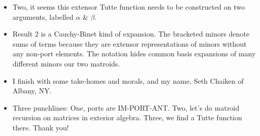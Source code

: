 \documentclass[14pt]{extarticle}
\begin{document}
{\begin{itemize}
\item
  Two, it seems this extensor Tutte function needs to be constructed on 
  two arguments, labelled $\alpha$ \& $\beta$.


\item
  Result 2 is a Cauchy-Binet kind of expansion. The bracketed minors denote sums of terms
  because they are extensor representations of minors without any non-port elements.
  The notation hides common basis expansions of many different minors our two matroids.


\item
  I finish with some take-homes and morals, and my name, Seth Chaiken
  of Albany, NY.

  \item
  Three punchlines:  One, ports are IM-PORT-ANT.
  Two, let's do matroid recursion on matrices in exterior algebra.
  Three, we find a Tutte function there.
  Thank you!
  \end{itemize}
}
\end{document}
